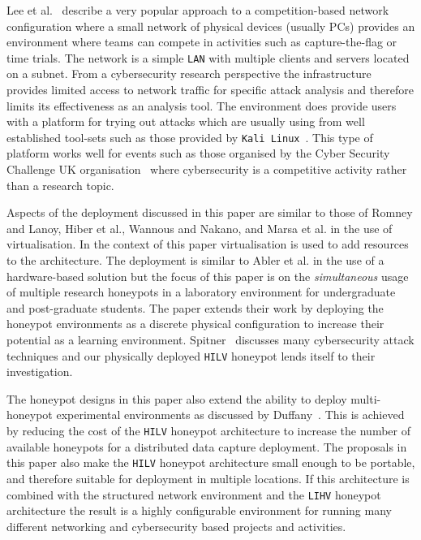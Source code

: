 \documentclass{ieeeaccess}
\begin{document}
Lee et al.~\cite{LUFC:11} describe a very popular approach to a competition-based network configuration where a small network of physical devices (usually PCs) provides an environment where teams can compete in activities such as capture-the-flag or time trials. The network is a simple \texttt{LAN} with multiple clients and servers located on a subnet. From a cybersecurity research perspective the infrastructure provides limited access to network traffic for specific attack analysis and therefore limits its effectiveness as an analysis tool. The environment does provide users with a platform for trying out attacks which are usually using from well established tool-sets such as those provided by \texttt{Kali Linux}~\cite{OS:17}. This type of platform works well for events such as those organised by the Cyber Security Challenge UK organisation~\cite{CSCUK:18} where cybersecurity is a competitive activity rather than a research topic.   

Aspects of the deployment discussed in this paper are similar to those of Romney and Lanoy, Hiber et al., Wannous and Nakano, and Marsa et al. in the use of virtualisation. In the context of this paper virtualisation is used to add resources to the architecture. The deployment is similar to Abler et al. in the use of a hardware-based solution but the focus of this paper is on the \textit{simultaneous} usage of multiple research honeypots in a laboratory environment for undergraduate and post-graduate students. The paper extends their work by deploying the honeypot environments as a discrete physical configuration to increase their potential as a learning environment. Spitner~\cite{LS:03} discusses many cybersecurity attack techniques and our physically deployed \texttt{HILV} honeypot lends itself to their investigation. 

The honeypot designs in this paper also extend the ability to deploy multi-honeypot
experimental environments as discussed by Duffany~\cite{JD:08}. This is
achieved by reducing the cost of the \texttt{HILV} honeypot architecture to increase the
number of available honeypots for a distributed data capture deployment. The
proposals in this paper also make the \texttt{HILV} honeypot architecture small
enough to be portable, and therefore suitable for deployment in 
multiple locations. If this architecture is combined with the structured network environment and the \texttt{LIHV} honeypot architecture the result is a highly configurable environment for running many different networking and cybersecurity based projects and activities.
\end{document}
